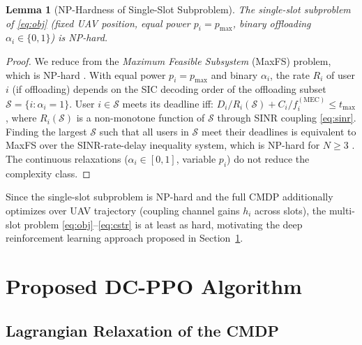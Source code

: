 \documentclass[journal]{IEEEtran}
\newtheorem{lemma}{Lemma}
\newcommand{\mec}{\text{MEC}}
\begin{document}
\begin{lemma}[NP-Hardness of Single-Slot Subproblem]
\label{lem:nphard}
The single-slot subproblem of \eqref{eq:obj} (fixed UAV
position, equal power $p_i {=} p_{\max}$, binary offloading
$\alpha_i {\in} \{0,1\}$) is NP-hard.
\end{lemma}
\begin{proof}
We reduce from the \emph{Maximum Feasible Subsystem} (MaxFS)
problem, which is NP-hard \cite{luo2008dynamic}.
With equal power $p_i {=} p_{\max}$ and binary $\alpha_i$,
the rate $R_i$ of user $i$ (if offloading) depends on the
SIC decoding order of the offloading subset
$\mathcal{S} = \{i : \alpha_i {=} 1\}$.
User $i \in \mathcal{S}$ meets its deadline iff:
$D_i / R_i(\mathcal{S}) + C_i / f_i^{(\mec)} \le t_{\max}$,
where $R_i(\mathcal{S})$ is a non-monotone function of
$\mathcal{S}$ through SINR coupling \eqref{eq:sinr}.
Finding the largest $\mathcal{S}$ such that all users in
$\mathcal{S}$ meet their deadlines is equivalent to
MaxFS over the SINR-rate-delay inequality system,
which is NP-hard for $N \ge 3$ \cite{luo2008dynamic}.
The continuous relaxations ($\alpha_i \in [0,1]$, variable
$p_i$) do not reduce the complexity class.
\end{proof}

\noindent Since the single-slot subproblem is NP-hard and the
full CMDP additionally optimizes over UAV trajectory (coupling
channel gains $h_i$ across slots), the multi-slot problem
\eqref{eq:obj}--\eqref{eq:cstr} is at least as hard,
motivating the deep reinforcement learning approach proposed
in Section~\ref{sec:algorithm}.

\section{Proposed DC-PPO Algorithm}\label{sec:algorithm}

\subsection{Lagrangian Relaxation of the CMDP}
\end{document}
